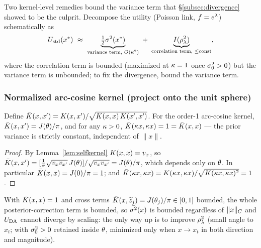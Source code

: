 Two kernel-level remedies bound the variance term that
\S\ref{subsec:divergence} showed to be the culprit. Decompose the utility (Poisson
link, $f=e^{\lambda}$) schematically as
\[
  \Ustd(x^*)\ \approx\ \underbrace{\tfrac12\pvar(x^*)}_{\text{variance term, }O(\scal^2)}\ +\ \underbrace{I(\corr^2)}_{\text{correlation term, }\le\text{const}} ,
\]
where the correlation term is bounded (maximized at $\kappa=1$ once $\sigma_{0}^2>0$) but
the variance term is unbounded; to fix the divergence, bound the variance term.

\subsubsection{Normalized arc-cosine kernel (project onto the unit sphere)}
\begin{proposition}\label{prop:normkernel}
Define $\bar{K}(x,x')=K(x,x')/\sqrt{K(x,x)\,K(x',x')}$. For the order-1
arc-cosine kernel, $\bar{K}(x,x')=J(\theta)/\pi$, and for any $\kappa>0$,
$\bar{K}(\kappa x,\kappa x)=1=\bar{K}(x,x)$ --- the prior variance is strictly
constant, independent of $\lVert x\rVert$.
\end{proposition}
\begin{proof}
By Lemma~\ref{lem:selfkernel} $K(x,x)=v_x$, so
$\bar{K}(x,x')=[\tfrac1\pi\sqrt{v_xv_{x'}}\,J(\theta)]/\sqrt{v_xv_{x'}}=J(\theta)/\pi$,
which depends only on $\theta$. In particular $\bar{K}(x,x)=J(0)/\pi=1$; and
$\bar{K}(\kappa x,\kappa x)=K(\kappa x,\kappa x)/\sqrt{K(\kappa x,\kappa x)^2}=1$.
\end{proof}
With $\bar{K}(x,x)=1$ and cross terms $\bar{K}(x,\widetilde{z}_j)=J(\theta_j)/\pi\in[0,1]$
bounded, the whole posterior-correction term is bounded, so $\bar{\sigma^{2}}(x)$ is
bounded regardless of $\lVert x\rVert_{C}$ and $U_{\mathrm{DA}}$ cannot diverge by
scaling: the only way up is to improve $\rho_{\lambda}^2$ (small angle to $x_t$; with
$\sigma_{0}^2>0$ retained inside $\theta$, minimized only when $x\to x_t$ in both
direction and magnitude).

